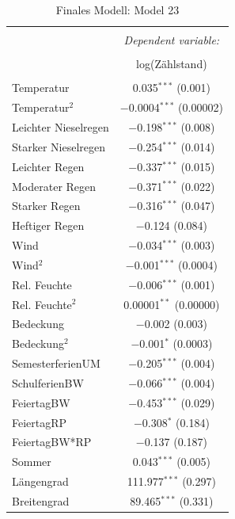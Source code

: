\documentclass[a4paper,12pt]{thesis}
\begin{document}
\begin{table}[!htbp] \centering 
	\caption{Finales Modell: Model 23} 
	\label{FinalFinalModel} 
	\small 
	\begin{tabular}{@{\extracolsep{-15pt}}lc} 
		\\[-1.8ex]\hline 
		\hline \\[-1.8ex] 
		& \multicolumn{1}{c}{\textit{Dependent variable:}} \\ 
		\cline{2-2} 
		\\[-1.8ex] & log(Zählstand) \\ 
		\hline \\[-1.8ex] 
		Temperatur & 0.035$^{***}$ (0.001) \\ 
		Temperatur$^2$ & $-$0.0004$^{***}$ (0.00002) \\ 
		Leichter Nieselregen & $-$0.198$^{***}$ (0.008) \\ 
		Starker Nieselregen & $-$0.254$^{***}$ (0.014) \\ 
		Leichter Regen & $-$0.337$^{***}$ (0.015) \\ 
		Moderater Regen & $-$0.371$^{***}$ (0.022) \\ 
		Starker Regen & $-$0.316$^{***}$ (0.047) \\ 
		Heftiger Regen & $-$0.124 (0.084) \\ 
		Wind & $-$0.034$^{***}$ (0.003) \\ 
		Wind$^2$ & $-$0.001$^{***}$ (0.0004) \\ 
		Rel. Feuchte & $-$0.006$^{***}$ (0.001) \\ 
		Rel. Feuchte$^2$ & 0.00001$^{**}$ (0.00000) \\ 
		Bedeckung & $-$0.002 (0.003) \\ 
		Bedeckung$^2$ & $-$0.001$^{*}$ (0.0003) \\ 
		SemesterferienUM & $-$0.205$^{***}$ (0.004) \\ 
		SchulferienBW & $-$0.066$^{***}$ (0.004) \\ 
		FeiertagBW & $-$0.453$^{***}$ (0.029) \\ 
		FeiertagRP & $-$0.308$^{*}$ (0.184) \\ 
		FeiertagBW*RP & $-$0.137 (0.187) \\ 
		Sommer & 0.043$^{***}$ (0.005) \\ 
		Längengrad & 111.977$^{***}$ (0.297) \\ 
		Breitengrad & 89.465$^{***}$ (0.331) \\ 

\end{tabular}
\end{table}
\end{document}
